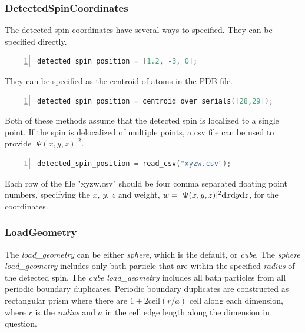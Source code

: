 \documentclass{book}
\begin{document}
\subsubsection{DetectedSpinCoordinates} %
The detected spin coordinates have several ways to specified.
They can be specified directly.
\begin{lstlisting}[frame=single,numbers=left,language=c]
detected_spin_position = [1.2, -3, 0];
\end{lstlisting}
They can be specified as the centroid of atoms in the PDB file.
\begin{lstlisting}[frame=single,numbers=left,language=c]
detected_spin_position = centroid_over_serials([28,29]);
\end{lstlisting}
Both of these methods assume that the detected spin is localized to a single
point.  If the spin is delocalized of multiple points, a csv file can be used
to provide $|\Psi(x,y,z)|^2$.  
\begin{lstlisting}[frame=single,numbers=left,language=c]
detected_spin_position = read_csv("xyzw.csv");
\end{lstlisting}
Each row of the file "xyzw.csv" should be four comma separated floating point
numbers, specifying the $x$, $y$, $z$ and weight,
$w = |\Psi(x,y,z)|^2 \text{d} x \text{d} y \text{d} z$, for the coordinates.

\subsubsection{LoadGeometry} %
The \textit{load\_geometry} can be either \textit{sphere}, 
which is the default, or \textit{cube}.  The \textit{sphere} 
\textit{load\_geometry} includes only bath particle that are within the
specified \textit{radius} of the detected spin.  The \textit{cube} 
\textit{load\_geometry} includes all bath particles from all periodic 
boundary duplicates.  
Periodic boundary duplicates are constructed as rectangular prism where there
are $1 + 2\text{ceil}(r/a)$ cell along each dimension, 
where $r$ is the \textit{radius} and $a$ in the cell edge length along the
dimension in question. 
\end{document}
